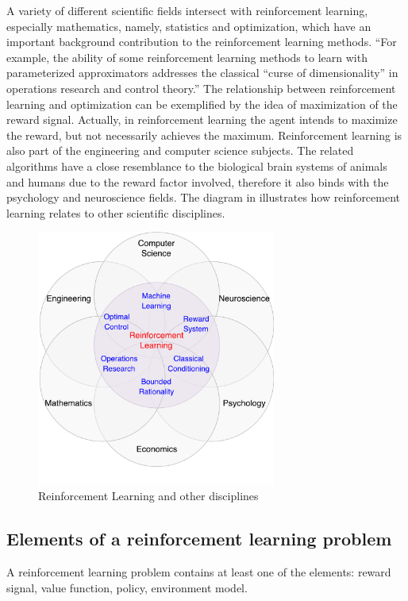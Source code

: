 A variety of different scientific fields intersect with reinforcement learning, especially mathematics, namely, statistics and optimization, which have an important background contribution to the reinforcement learning methods. “For example, the ability of some reinforcement learning methods to learn with parameterized approximators addresses the classical “curse of dimensionality” in operations research and control theory.” \cite{Sutton} The relationship between reinforcement learning and optimization can be exemplified by the idea of maximization of the reward signal. Actually, in reinforcement learning the agent intends to maximize the reward, but not necessarily achieves the maximum. Reinforcement learning is also part of the engineering and computer science subjects. The related algorithms have a close resemblance to the biological brain systems of animals and humans due to the reward factor involved, therefore it also binds with the psychology and neuroscience fields. The diagram in  illustrates how reinforcement learning relates to other scientific disciplines.
\begin{figure}[H]
	\centering
	\includegraphics[width=0.7\textwidth]{Figures/RLandOther}
	\caption{Reinforcement Learning and other disciplines}
	\label{fig:RLandOther}
\end{figure}
\subsection{Elements of a reinforcement learning problem}
A reinforcement learning problem contains at least one of the elements: reward signal, value function, policy, environment model.

